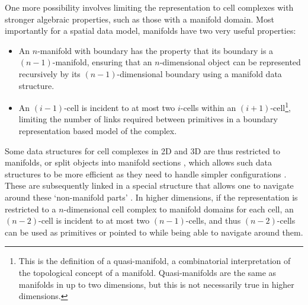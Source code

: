 One more possibility involves limiting the representation to cell complexes with stronger algebraic properties, such as those with a manifold domain.
Most importantly for a spatial data model, manifolds have two very useful properties:
\begin{itemize}
\item
An $n$-manifold with boundary has the property that its boundary is a $(n-1)$-manifold, ensuring that an $n$-dimensional object can be represented recursively by its $(n-1)$-dimensional boundary using a manifold data structure.
\item
An $(i-1)$-cell is incident to at most two $i$-cells within an $(i+1)$-cell\footnote{This is the definition of a quasi-manifold, a combinatorial interpretation of the topological concept of a manifold.
Quasi-manifolds are the same as manifolds in up to two dimensions, but this is not necessarily true in higher dimensions.}, limiting the number of links required between primitives in a boundary representation based model of the complex.
\end{itemize}

Some data structures for cell complexes in 2D and 3D are thus restricted to manifolds, or split objects into manifold sections \citep{Pesco04,Lopes97}, which allows such data structures to be more efficient as they need to handle simpler configurations \citep{Aguila03}.
These are subsequently linked in a special structure that allows one to navigate around these `non-manifold parts' \citep{Weiler88,Gursoz90,Lee01}.
In higher dimensions, if the representation is restricted to a $n$-dimensional cell complex to manifold domains for each cell, an $(n-2)$-cell is incident to at most two $(n-1)$-cells, and thus $(n-2)$-cells can be used as primitives or pointed to while being able to navigate around them.

